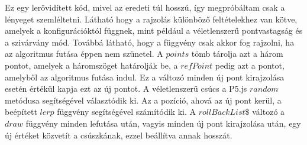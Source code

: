 Ez egy lerövidített kód, mivel az eredeti túl hosszú, így megpróbáltam csak a lényeget szemléltetni. Látható hogy a rajzolás különböző feltételekhez van kötve, amelyek a konfigurációktól függnek, mint például a véletlenszerű pontvastagság és a szivárvány mód. Továbbá látható, hogy a függvény csak akkor fog rajzolni, ha az algoritmus futása éppen nem szünetel. A $points$ tömb tárolja azt a három pontot, amelyek a háromszöget határolják be, a $refPoint$ pedig azt a pontot, amelyből az algoritmus futása indul. Ez a változó minden új pont kirajzolása esetén értékül kapja ezt az új pontot. A véletlenszerű csúcs a P5.js $random$ metódusa segítségével választódik ki. Az a pozíció, ahová az új pont kerül, a beépített $lerp$ függvény segítségével számítódik ki. A $rollBackList\$$ változó a $draw$ függvény minden lefutása után, vagyis minden új pont kirajzolása után, egy új értéket közvetít a csúszkának, ezzel beállítva annak hosszát.
